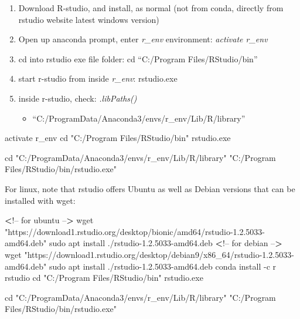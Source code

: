 \documentclass[
]{article}
\newenvironment{Shaded}{\begin{snugshade}}{\end{snugshade}}
\newcommand{\BuiltInTok}[1]{#1}
\newcommand{\ExtensionTok}[1]{#1}
\newcommand{\FunctionTok}[1]{\textcolor[rgb]{0.00,0.00,0.00}{#1}}
\newcommand{\NormalTok}[1]{#1}
\newcommand{\OperatorTok}[1]{\textcolor[rgb]{0.81,0.36,0.00}{\textbf{#1}}}
\newcommand{\StringTok}[1]{\textcolor[rgb]{0.31,0.60,0.02}{#1}}
\providecommand{\tightlist}{%
  \setlength{\itemsep}{0pt}\setlength{\parskip}{0pt}}
\begin{document}
\begin{enumerate}
\def\labelenumi{\arabic{enumi}.}
\tightlist
\item
  Download R-studio, and install, as normal (not from conda, directly
  from rstudio website latest windows version)
\item
  Open up anaconda prompt, enter \emph{r\_env} environment:
  \emph{activate r\_env}
\item
  cd into rstudio exe file folder: cd ``C:/Program Files/RStudio/bin''
\item
  start r-studio from inside \emph{r\_env}: rstudio.exe
\item
  inside r-studio, check: \emph{.libPaths()}

  \begin{itemize}
  \tightlist
  \item
    ``C:/ProgramData/Anaconda3/envs/r\_env/Lib/R/library''
  \end{itemize}
\end{enumerate}

\begin{Shaded}
\begin{Highlighting}[]
\ExtensionTok{activate}\NormalTok{ r_env}
\BuiltInTok{cd} \StringTok{"C:/Program Files/RStudio/bin"}
\ExtensionTok{rstudio.exe}

\BuiltInTok{cd} \StringTok{"C:/ProgramData/Anaconda3/envs/r_env/Lib/R/library"}
\StringTok{"C:/Program Files/RStudio/bin/rstudio.exe"}
\end{Highlighting}
\end{Shaded}

For linux, note that rstudio offers Ubuntu as well as Debian versions
that can be installed with wget:

\begin{Shaded}
\begin{Highlighting}[]
\OperatorTok{<}\NormalTok{!}\ExtensionTok{--}\NormalTok{ for ubuntu --}\OperatorTok{>}
\FunctionTok{wget} \StringTok{"https://download1.rstudio.org/desktop/bionic/amd64/rstudio-1.2.5033-amd64.deb"}
\FunctionTok{sudo}\NormalTok{ apt install ./rstudio-1.2.5033-amd64.deb}
\OperatorTok{<}\NormalTok{!}\ExtensionTok{--}\NormalTok{ for debian --}\OperatorTok{>}
\FunctionTok{wget} \StringTok{"https://download1.rstudio.org/desktop/debian9/x86_64/rstudio-1.2.5033-amd64.deb"}
\FunctionTok{sudo}\NormalTok{ apt install ./rstudio-1.2.5033-amd64.deb}
\ExtensionTok{conda}\NormalTok{ install -c r rstudio}
\BuiltInTok{cd} \StringTok{"C:/Program Files/RStudio/bin"}
\ExtensionTok{rstudio.exe}

\BuiltInTok{cd} \StringTok{"C:/ProgramData/Anaconda3/envs/r_env/Lib/R/library"}
\StringTok{"C:/Program Files/RStudio/bin/rstudio.exe"}
\end{Highlighting}
\end{Shaded}
\end{document}
